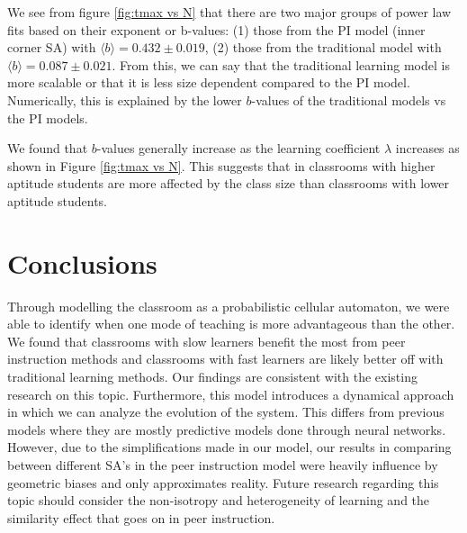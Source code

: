 \documentclass[10pt,a4paper,twoside]{article}
\begin{document}
We see from figure \ref{fig:tmax vs N} that there are two major groups of power law fits based on their exponent or b-values: (1) those from the PI model (inner corner SA) with $\langle b \rangle = 0.432 \pm 0.019$, (2) those from the traditional model with $\langle b \rangle = 0.087\pm0.021$. From this, we can say that the traditional learning model is more scalable or that it is less size dependent compared to the PI model. Numerically, this is explained by the lower $b$-values of the traditional models vs the PI models. 

We found that $b$-values generally increase as the learning coefficient $\lambda$ increases as shown in Figure \ref{fig:tmax vs N}. This suggests that in classrooms with higher aptitude students are more affected by the class size than classrooms with lower aptitude students.

\section{Conclusions}
Through modelling the classroom as a probabilistic cellular automaton, we were able to identify when one mode of teaching is more advantageous than the other. We found that classrooms with slow learners benefit the most from peer instruction methods and classrooms with fast learners are likely better off with traditional learning methods. Our findings are consistent with the existing research on this topic. Furthermore, this model introduces a dynamical approach in which we can analyze the evolution of the system. This differs from previous models where they are mostly predictive models done through neural networks. However, due to the simplifications made in our model, our results in comparing between different SA's in the peer instruction model were heavily influence by geometric biases and only approximates reality. Future research regarding this topic should consider the non-isotropy and heterogeneity of learning and the similarity effect that goes on in peer instruction.




\end{document}
